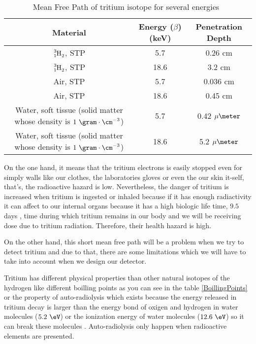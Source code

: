 \begin{table}[htbp]
\begin{center}
\begin{tabular}{|c|c|c|}
\hline
Material & Energy ($\beta$)(keV) & Penetration Depth \\
\hline \hline \hline
$\ce{\ce{^{3}_{1}H_2}}$, STP & 5.7 & 0.26 cm \\ \hline
$\ce{\ce{^{3}_{1}H_2}}$, STP & 18.6 & 3.2 cm \\ \hline
Air, STP & 5.7 & 0.036 cm \\ \hline
Air, STP & 18.6 & 0.45 cm \\ \hline
\parbox{10em}{\centering Water, soft tissue\\  (solid matter whose \\  density is $1~\gram\cdot\cm^{-3}$)} & 5.7 & 0.42 $\mu\meter$\\ \hline
\parbox{10em}{\centering Water, soft tissue\\  (solid matter whose \\  density is $1~\gram\cdot\cm^{-3}$)} & 18.6 & 5.2 $\mu\meter$ \\ \hline
\end{tabular}
\caption{Mean Free Path of tritium isotope for several energies~\cite{TritiumHandling}}
\label{MeanFreePathTritium}
\end{center}
\end{table}

On the one hand, it means that the tritium electrons is easily stopped even for simply walls like our clothes, the laboratories gloves or even the our skin it-self, that's, the radioactive hazard is low. Nevertheless, the danger of tritium is increased when tritium is ingested or inhaled because if it has enough radiactivity it can affect to our internal organs because it has a high biologic life time, $9.5$ days \cite{TritiumHandling}, time during which tritium remains in our body and we will be receiving dose due to tritium radiation. Therefore, their health hazard is high.

On the other hand, this short mean free path will be a problem when we try to detect tritium and due to that, there are some limitations which we will have to take into account when we design our detector. 

Tritium has different physical properties than other natural isotopes of the hydrogen like different boilling points as you can see in the table \ref{BoillingPoints} or the property of auto-radiolysis which exists because the energy released in tritium decay is larger than the energy bond of oxigen and hydrogen in water molecules ($5.2~\eV$) or the ionization energy of water molecules ($12.6~\eV$) so it can break these molecules \cite{AutoRadyolisis}. Auto-radiolysis only happen when radioactive elements are presented.

